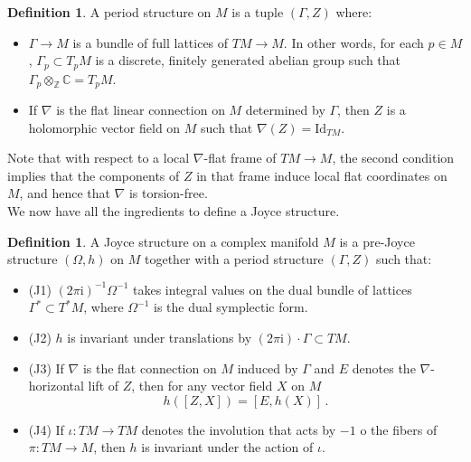 \documentclass{article}
\theoremstyle{definition}
\newtheorem{definition}[theorem]{Definition}
\numberwithin{equation}{section}
\begin{document}
\begin{definition} A period structure on $M$ is a tuple $(\Gamma, Z)$ where:
\begin{itemize}
    \item $\Gamma\to M$ is a bundle of full lattices of $TM\to M$. In other words, for each $p\in M$, $\Gamma_p\subset T_pM$ is a discrete, finitely generated abelian group such that $\Gamma_p\otimes_{\mathbb{Z}}\mathbb{C}= T_pM$.
    \item If $\nabla$ is the flat linear connection on $M$ determined by $\Gamma$, then $Z$ is a holomorphic vector field on $M$ such that $\nabla (Z) = \text{Id}_{TM}$.
\end{itemize}
\end{definition}
Note that with respect to a local $\nabla$-flat frame of $TM\to M$, the second condition implies that the components of $Z$ in that frame induce local flat coordinates on $M$, and hence that $\nabla$ is torsion-free. \\

We now have all the ingredients to define a Joyce structure.

\begin{definition}\label{Joyce_def} A Joyce structure on a complex manifold $M$ is a pre-Joyce structure $(\Omega,h)$ on $M$ together with a period structure $(\Gamma,Z)$ such that:
\begin{itemize}
    \item (J1)  $(2\pi \mathrm{i})^{-1}\Omega^{-1}$ takes integral values on the dual bundle of lattices $\Gamma^*\subset T^*M$, where $\Omega^{-1}$ is the dual symplectic form.
    \item (J2) $h$ is invariant under translations by $(2\pi \mathrm{i})\cdot \Gamma \subset TM$.
    \item (J3) If $\nabla$ is the flat connection on $M$ induced by $\Gamma$ and $E$ denotes the $\nabla$-horizontal lift of $Z$, then for any vector field $X$ on $M$ \begin{equation}
        h([Z,X])=[E,h(X)]\,.
    \end{equation}
    \item (J4) If $\iota:TM \to TM$ denotes the involution that acts by $-1$ o the fibers of $\pi:TM\to M$, then $h$ is invariant under the action of $\iota$.
\end{itemize}
\end{definition}
\end{document}
